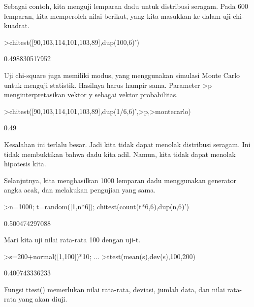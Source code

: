 \documentclass[a4paper,10pt]{article}
\begin{document}
\begin{eulernotebook}
\begin{eulercomment}
Sebagai contoh, kita menguji lemparan dadu untuk distribusi seragam.
Pada 600 lemparan, kita memperoleh nilai berikut, yang kita masukkan
ke dalam uji chi-kuadrat.
\end{eulercomment}
\begin{eulerprompt}
>chitest([90,103,114,101,103,89],dup(100,6)')
\end{eulerprompt}
\begin{euleroutput}
  0.498830517952
\end{euleroutput}
\begin{eulercomment}
Uji chi-square juga memiliki modus, yang menggunakan simulasi Monte
Carlo untuk menguji statistik. Hasilnya harus hampir sama. Parameter
\textgreater{}p menginterpretasikan vektor y sebagai vektor probabilitas.
\end{eulercomment}
\begin{eulerprompt}
>chitest([90,103,114,101,103,89],dup(1/6,6)',>p,>montecarlo)
\end{eulerprompt}
\begin{euleroutput}
  0.49
\end{euleroutput}
\begin{eulercomment}
Kesalahan ini terlalu besar. Jadi kita tidak dapat menolak distribusi
seragam. Ini tidak membuktikan bahwa dadu kita adil. Namun, kita tidak
dapat menolak hipotesis kita.

Selanjutnya, kita menghasilkan 1000 lemparan dadu menggunakan
generator angka acak, dan melakukan pengujian yang sama.
\end{eulercomment}
\begin{eulerprompt}
>n=1000; t=random([1,n*6]); chitest(count(t*6,6),dup(n,6)')
\end{eulerprompt}
\begin{euleroutput}
  0.500474297088
\end{euleroutput}
\begin{eulercomment}
Mari kita uji nilai rata-rata 100 dengan uji-t.
\end{eulercomment}
\begin{eulerprompt}
>s=200+normal([1,100])*10; ...
>ttest(mean(s),dev(s),100,200)
\end{eulerprompt}
\begin{euleroutput}
  0.400743336233
\end{euleroutput}
\begin{eulercomment}
Fungsi ttest() memerlukan nilai rata-rata, deviasi, jumlah data, dan
nilai rata-rata yang akan diuji.


\end{eulercomment}
\end{eulernotebook}
\end{document}

